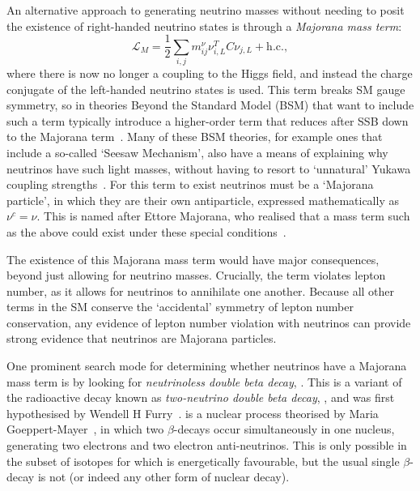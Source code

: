 An alternative approach to generating neutrino masses without needing to posit the existence of right-handed neutrino states is through a \textit{Majorana mass term}:
\begin{equation}
    \mathcal{L}_{M} = \frac{1}{2}\sum_{i,j}m^{\nu}_{ij}\nu^{T}_{i,L}C\nu_{j,L} + \mathrm{ h.c.},
\end{equation}
where there is now no longer a coupling to the Higgs field, and instead the charge conjugate of the left-handed neutrino states is used. This term breaks SM gauge symmetry, so in theories Beyond the Standard Model (BSM) that want to include such a term typically introduce a higher-order term that reduces after SSB down to the Majorana term~\cite{weinbergBaryonLeptonNonconservingProcesses1979}. %
Many of these BSM theories, for example ones that include a so-called `Seesaw Mechanism', also have a means of explaining why neutrinos have such light masses, without having to resort to `unnatural' Yukawa coupling strengths~\cite{minkowskiEgRateOne1977}. %
For this term to exist neutrinos must be a `Majorana particle', in which they are their own antiparticle, expressed mathematically as $\nu^{c} = \nu$. This is named after Ettore Majorana, who realised that a mass term such as the above could exist under these special conditions~\cite{majoranaTeoriaSimmetricaElettrone1937}. %

The existence of this Majorana mass term would have major consequences, beyond just allowing for neutrino masses. Crucially, the term violates lepton number, as it allows for neutrinos to annihilate one another. Because all other terms in the SM conserve the `accidental' symmetry of lepton number conservation, any evidence of lepton number violation with neutrinos can provide strong evidence that neutrinos are Majorana particles.

One prominent search mode for determining whether neutrinos have a Majorana mass term is by looking for \textit{neutrinoless double beta decay}, \onbb{}. This is a variant of the radioactive decay known as \textit{two-neutrino double beta decay}, \twonbb{}, and was first hypothesised by Wendell H Furry~\cite{furryTransitionProbabilitiesDouble1939}. %
\twonbb{} is a nuclear process theorised by Maria Goeppert-Mayer~\cite{goeppert-mayerDoubleBetaDisintegration1935}, %
in which two $\beta$-decays occur simultaneously in one nucleus, generating two electrons and two electron anti-neutrinos. This is only possible in the subset of isotopes for which \twonbb{} is energetically favourable, but the usual single $\beta$-decay is not (or indeed any other form of nuclear decay).

